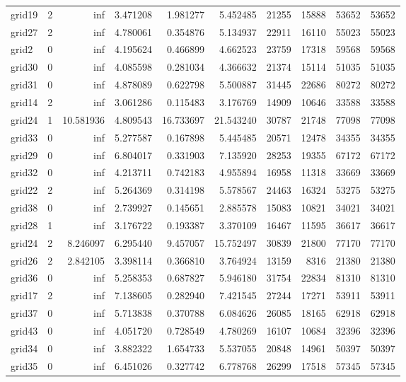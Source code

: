 \begin{longtable}{|l|r|r|r|r|r|r|r|r|r|}
grid19 & 2 & inf & 3.471208 & 1.981277 & 5.452485 & 21255 & 15888 & 53652 & 53652 \\
grid27 & 2 & inf & 4.780061 & 0.354876 & 5.134937 & 22911 & 16110 & 55023 & 55023 \\
grid2 & 0 & inf & 4.195624 & 0.466899 & 4.662523 & 23759 & 17318 & 59568 & 59568 \\
grid30 & 0 & inf & 4.085598 & 0.281034 & 4.366632 & 21374 & 15114 & 51035 & 51035 \\
grid31 & 0 & inf & 4.878089 & 0.622798 & 5.500887 & 31445 & 22686 & 80272 & 80272 \\
grid14 & 2 & inf & 3.061286 & 0.115483 & 3.176769 & 14909 & 10646 & 33588 & 33588 \\
grid24 & 1 & 10.581936 & 4.809543 & 16.733697 & 21.543240 & 30787 & 21748 & 77098 & 77098 \\
grid33 & 0 & inf & 5.277587 & 0.167898 & 5.445485 & 20571 & 12478 & 34355 & 34355 \\
grid29 & 0 & inf & 6.804017 & 0.331903 & 7.135920 & 28253 & 19355 & 67172 & 67172 \\
grid32 & 0 & inf & 4.213711 & 0.742183 & 4.955894 & 16958 & 11318 & 33669 & 33669 \\
grid22 & 2 & inf & 5.264369 & 0.314198 & 5.578567 & 24463 & 16324 & 53275 & 53275 \\
grid38 & 0 & inf & 2.739927 & 0.145651 & 2.885578 & 15083 & 10821 & 34021 & 34021 \\
grid28 & 1 & inf & 3.176722 & 0.193387 & 3.370109 & 16467 & 11595 & 36617 & 36617 \\
grid24 & 2 & 8.246097 & 6.295440 & 9.457057 & 15.752497 & 30839 & 21800 & 77170 & 77170 \\
grid26 & 2 & 2.842105 & 3.398114 & 0.366810 & 3.764924 & 13159 & 8316 & 21380 & 21380 \\
grid36 & 0 & inf & 5.258353 & 0.687827 & 5.946180 & 31754 & 22834 & 81310 & 81310 \\
grid17 & 2 & inf & 7.138605 & 0.282940 & 7.421545 & 27244 & 17271 & 53911 & 53911 \\
grid37 & 0 & inf & 5.713838 & 0.370788 & 6.084626 & 26085 & 18165 & 62918 & 62918 \\
grid43 & 0 & inf & 4.051720 & 0.728549 & 4.780269 & 16107 & 10684 & 32396 & 32396 \\
grid34 & 0 & inf & 3.882322 & 1.654733 & 5.537055 & 20848 & 14961 & 50397 & 50397 \\
grid35 & 0 & inf & 6.451026 & 0.327742 & 6.778768 & 26299 & 17518 & 57345 & 57345 \\

\end{longtable}
